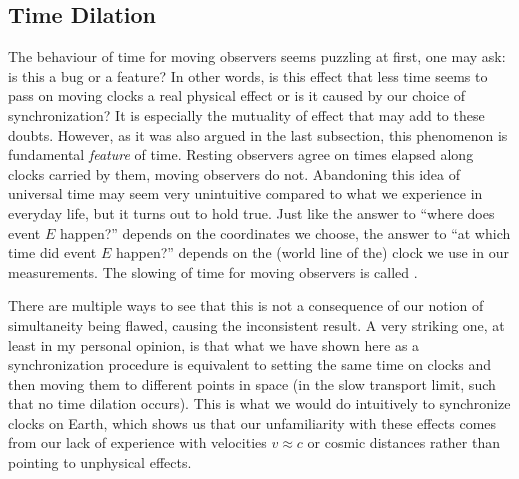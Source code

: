 		\subsection{Time Dilation}
The behaviour of time for moving observers seems puzzling at first, one may ask: is this a bug or a feature? In other words, is this effect that less time seems to pass on moving clocks a real physical effect or is it caused by our choice of synchronization? It is especially the mutuality of effect that may add to these doubts. However, as it was also argued in the last subsection, this phenomenon is fundamental \emph{feature} of time. Resting observers agree on times elapsed along clocks carried by them, moving observers do not. Abandoning this idea of universal time may seem very unintuitive compared to what we experience in everyday life, but it turns out to hold true. Just like the answer to \enquote{where does event $E$ happen?} depends on the coordinates we choose, the answer to \enquote{at which time did event $E$ happen?} depends on the (world line of the) clock we use in our measurements. The slowing of time for moving observers is called .


There are multiple ways to see that this is not a consequence of our notion of simultaneity being flawed, causing the inconsistent result. A very striking one, at least in my personal opinion, is that what we have shown here as a synchronization procedure is equivalent to setting the same time on clocks and then moving them to different points in space (in the slow transport limit, such that no time dilation occurs). This is what we would do intuitively to synchronize clocks on Earth, which shows us that our unfamiliarity with these effects comes from our lack of experience with velocities $v \approx c$ or cosmic distances rather than pointing to unphysical effects.\\


